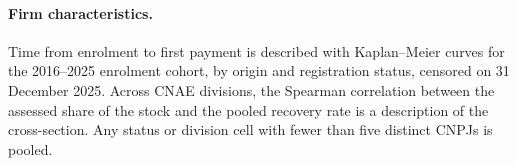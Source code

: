 \paragraph{Firm characteristics.}
Time from enrolment to first payment is described with Kaplan--Meier curves \citep{kaplan1958} for the 2016--2025 enrolment cohort, by origin and registration status, censored on 31 December 2025.
Across CNAE divisions, the Spearman correlation \citep{spearman1904} between the assessed share of the stock and the pooled recovery rate is a description of the cross-section.
Any status or division cell with fewer than five distinct CNPJs is pooled.

